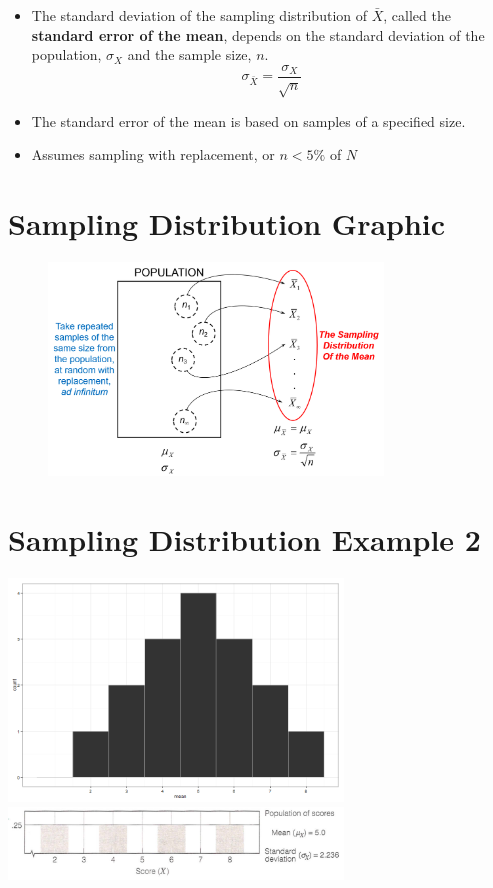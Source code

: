 \documentclass[12pt]{article}
\begin{document}
\begin{itemize}
\itemsep1pt\parskip0pt
\item
  The standard deviation of the sampling distribution of \(\bar{X}\),
  called the \textbf{standard error of the mean}, depends on the
  standard deviation of the population, \(\sigma_{X}\) and the sample
  size, \(n\). \[ \sigma_{\bar{X}} = \frac{\sigma_{X}}{\sqrt{n}} \]
\item
  The standard error of the mean is based on samples of a specified
  size.
\item
  Assumes sampling with replacement, or \(n < 5\%\) of \(N\)
\end{itemize}

\section{Sampling Distribution
Graphic}\label{sampling-distribution-graphic}

\begin{figure}[H]
\centering
\includegraphics[width=3.5in]{sample_dist_general.png}
\caption{}
\end{figure}

\section{Sampling Distribution Example
2}\label{sampling-distribution-example-2}

\includegraphics[width=3.5in]{figure/sampdist2-1.png}
\includegraphics[width=3.5in]{sample_dist_population.png}
\end{document}
